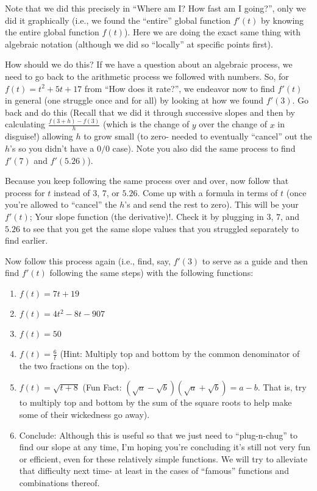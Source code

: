 \documentclass{ximera}
\begin{document}
Note that we did this precisely in ``Where am I? How fast am I going?'', only we did it graphically (i.e., we found the ``entire'' global function $f'(t)$ by knowing the entire global function $f(t)$).   Here we are doing the exact same thing with algebraic notation (although we did so ``locally'' at specific points first).

How should we do this?  If we have a question about an algebraic process, we need to go back to the arithmetic process we followed with numbers.  So, for $f(t) = t^2+5t+17$ from ``How does it rate?'', we endeavor now to find $f'(t)$ in general (one struggle once and for all) by looking at how we found  $f'(3)$.  Go back and do this (Recall that we did it through successive slopes and then by calculating $\frac{f(3+h)- f(3)}{h}$ (which is the change of $y$ over the change of $x$ in disguise!) allowing $h$ to grow small (to zero- needed to eventually ``cancel'' out the $h$'s so you didn't have a $0/0$ case).  Note you also did the same process to find $f'(7)$ and  $f'(5.26)$).

Because you keep following the same process over and over, now follow that process for $t$ instead of $3$, $7$, or $5.26$.  Come up with a formula in terms of $t$ (once you're allowed to ``cancel'' the $h$'s and send the rest to zero).  This will be your  $f'(t)$;  Your slope function (the derivative)!.  Check it by plugging in $3$, $7$, and $5.26$ to see that you get the same slope values that you struggled separately to find earlier.

\begin{question} 
Now follow this process again (i.e., find, say, $f'(3)$ to serve as a guide and then find $f'(t)$ following the same steps) with the following functions:
\begin{enumerate}
\item $f(t) = 7t+19$     
\item $f(t) = 4t^2-8t-907$     
\item $f(t) = 50$
\item $f(t) = \frac{6}{t}$  (Hint:  Multiply top and bottom by the common denominator of the two fractions on the top).
\item $f(t) = \sqrt{t+8}$  (Fun Fact: $(\sqrt{a} - \sqrt{b})(\sqrt{a} + \sqrt{b}) = a-b$.   That is, try to multiply top and bottom by the sum of the square roots to help make some of their wickedness go away).
\item   Conclude:  Although this is useful so that we just need to ``plug-n-chug'' to find our slope at any time, I'm hoping you're concluding it's still not very fun or efficient, even for these relatively simple functions.  We will try to alleviate that difficulty next time- at least in the cases of ``famous'' functions and combinations thereof.
\end{enumerate}
\end{question}
\end{document}
